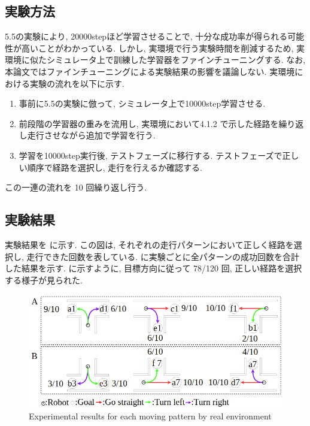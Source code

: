 \subsection{実験方法}
5.5の実験により, 20000stepほど学習させることで, 十分な成功率が得られる可能性が高いことがわかっている. しかし, 実環境で行う実験時間を削減するため, 実環境に似たシミュレータ上で訓練した学習器をファインチューニングする. なお, 本論文ではファインチューニングによる実験結果の影響を議論しない. 実環境における実験の流れを以下に示す.
\begin{enumerate}
  \item 事前に5.5の実験に倣って, シミュレータ上で10000step学習させる. 
  \item 前段階の学習器の重みを流用し, 実環境において4.1.2 で示した経路を繰り返し走行させながら追加で学習を行う.
  \item 学習を10000step実行後, テストフェーズに移行する. テストフェーズで正しい順序で経路を選択し, 走行を行えるか確認する.
\end{enumerate}
この一連の流れを 10 回繰り返し行う.

\subsection{実験結果}
実験結果を  に示す. この図は, それぞれの走行パターンにおいて正しく経路を選択し, 走行できた回数を表している.  に実験ごとに全パターンの成功回数を合計した結果を示す.  に示すように, 目標方向に従って 78/120 回, 正しい経路を選択する様子が見られた.

\begin{figure}[hbtp]
  \centering
 \includegraphics[keepaspectratio, scale=0.45]
      {images/real_result.png}
 \caption{Experimental results for each moving pattern by real environment}
 \label{Fig:real_result}
\end{figure}


